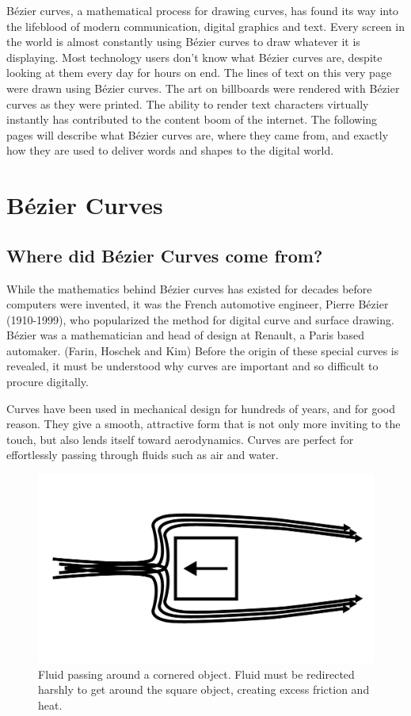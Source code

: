 \documentclass[12pt,letterpaper]{article}
\begin{document}
Bézier curves, a mathematical process for drawing curves, has found its way into the lifeblood of modern communication, digital graphics and text. Every screen in the world is almost constantly using Bézier curves to draw whatever it is displaying. Most technology users don’t know what Bézier curves are, despite looking at them every day for hours on end.  The lines of text on this very page were drawn using Bézier curves. The art on billboards were rendered with Bézier curves as they were printed. The ability to render text characters virtually instantly has contributed to the content boom of the internet. The following pages will describe what Bézier curves are, where they came from, and exactly how they are used to deliver words and shapes to the digital world.


\section{B\'ezier Curves}

\subsection{Where did B\'ezier Curves come from?}
While the mathematics behind Bézier curves has existed for decades before computers were invented, it was the French automotive engineer, Pierre Bézier (1910-1999), who popularized the method for digital curve and surface drawing. B\'ezier was a mathematician and head of design at Renault, a Paris based automaker. (Farin, Hoschek and Kim) Before the origin of these special curves is revealed, it must be understood why curves are important and so difficult to procure digitally.

Curves have been used in mechanical design for hundreds of years, and for good reason. They give a smooth, attractive form that is not only more inviting to the touch, but also lends itself toward aerodynamics. Curves are perfect for effortlessly passing through fluids such as air and water.

\begin{figure}[H]
\includegraphics[width=12cm]{aero-square}
\centering
\caption{Fluid passing around a cornered object. Fluid must be redirected harshly to get around the square object, creating excess friction and heat.}
\end{figure}
\end{document}
